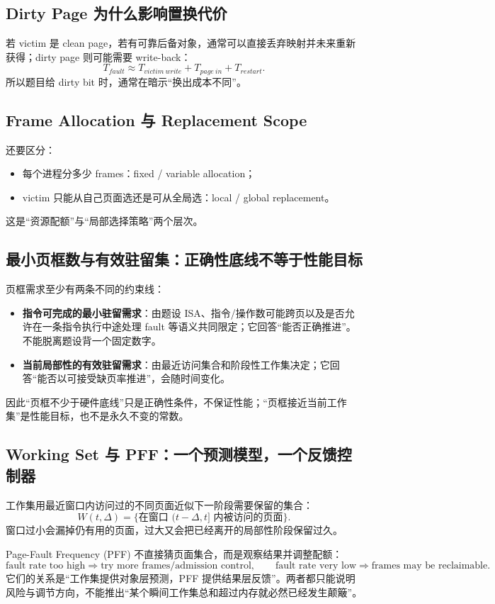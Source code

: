 \documentclass[11pt,a4paper]{ctexart}
\newcommand{\kw}[1]{\textbf{#1}}
\begin{document}
\subsection{Dirty Page 为什么影响置换代价}
若 victim 是 clean page，若有可靠后备对象，通常可以直接丢弃映射并未来重新获得；dirty page 则可能需要 write-back：
\[
T_{fault}\approx T_{victim\ write}+T_{page\ in}+T_{restart}.
\]
所以题目给 dirty bit 时，通常在暗示“换出成本不同”。

\subsection{Frame Allocation 与 Replacement Scope}
还要区分：
\begin{itemize}
  \item 每个进程分多少 frames：fixed / variable allocation；
  \item victim 只能从自己页面选还是可从全局选：local / global replacement。
\end{itemize}
这是“资源配额”与“局部选择策略”两个层次。

\subsection{最小页框数与有效驻留集：正确性底线不等于性能目标}

页框需求至少有两条不同的约束线：
\begin{itemize}
  \item \kw{指令可完成的最小驻留需求}：由题设 ISA、指令/操作数可能跨页以及是否允许在一条指令执行中途处理 fault 等语义共同限定；它回答“能否正确推进”。不能脱离题设背一个固定数字。
  \item \kw{当前局部性的有效驻留需求}：由最近访问集合和阶段性工作集决定；它回答“能否以可接受缺页率推进”，会随时间变化。
\end{itemize}

因此“页框不少于硬件底线”只是正确性条件，不保证性能；“页框接近当前工作集”是性能目标，也不是永久不变的常数。

\subsection{Working Set 与 PFF：一个预测模型，一个反馈控制器}

工作集用最近窗口内访问过的不同页面近似下一阶段需要保留的集合：
\[
W(t,\Delta)=\{\text{在窗口 }(t-\Delta,t]\text{ 内被访问的页面}\}.
\]
窗口过小会漏掉仍有用的页面，过大又会把已经离开的局部性阶段保留过久。

Page-Fault Frequency (PFF) 不直接猜页面集合，而是观察结果并调整配额：
\[
\boxed{
\text{fault rate too high}\Rightarrow\text{try more frames/admission control},\qquad
\text{fault rate very low}\Rightarrow\text{frames may be reclaimable}.
}
\]
它们的关系是“工作集提供对象层预测，PFF 提供结果层反馈”。两者都只能说明风险与调节方向，不能推出“某个瞬间工作集总和超过内存就必然已经发生颠簸”。
\end{document}
